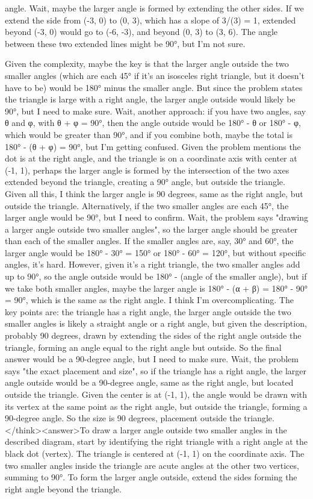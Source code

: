 angle. Wait, maybe the larger angle is formed by extending the other sides. If we extend the side from (-3, 0) to (0, 3), which has a slope of 3/(3) = 1, extended beyond (-3, 0) would go to (-6, -3), and beyond (0, 3) to (3, 6). The angle between these two extended lines might be 90°, but I'm not sure. 

Given the complexity, maybe the key is that the larger angle outside the two smaller angles (which are each 45° if it's an isosceles right triangle, but it doesn't have to be) would be 180° minus the smaller angle. But since the problem states the triangle is large with a right angle, the larger angle outside would likely be 90°, but I need to make sure. Wait, another approach: if you have two angles, say θ and φ, with θ + φ = 90°, then the angle outside would be 180° - θ or 180° - φ, which would be greater than 90°, and if you combine both, maybe the total is 180° - (θ + φ) = 90°, but I'm getting confused. Given the problem mentions the dot is at the right angle, and the triangle is on a coordinate axis with center at (-1, 1), perhaps the larger angle is formed by the intersection of the two axes extended beyond the triangle, creating a 90° angle, but outside the triangle. Given all this, I think the larger angle is 90 degrees, same as the right angle, but outside the triangle. Alternatively, if the two smaller angles are each 45°, the larger angle would be 90°, but I need to confirm. Wait, the problem says "drawing a larger angle outside two smaller angles", so the larger angle should be greater than each of the smaller angles. If the smaller angles are, say, 30° and 60°, the larger angle would be 180° - 30° = 150° or 180° - 60° = 120°, but without specific angles, it's hard. However, given it's a right triangle, the two smaller angles add up to 90°, so the angle outside would be 180° - (angle of the smaller angle), but if we take both smaller angles, maybe the larger angle is 180° - (α + β) = 180° - 90° = 90°, which is the same as the right angle. I think I'm overcomplicating. The key points are: the triangle has a right angle, the larger angle outside the two smaller angles is likely a straight angle or a right angle, but given the description, probably 90 degrees, drawn by extending the sides of the right angle outside the triangle, forming an angle equal to the right angle but outside. So the final answer would be a 90-degree angle, but I need to make sure. Wait, the problem says "the exact placement and size", so if the triangle has a right angle, the larger angle outside would be a 90-degree angle, same as the right angle, but located outside the triangle. Given the center is at (-1, 1), the angle would be drawn with its vertex at the same point as the right angle, but outside the triangle, forming a 90-degree angle. So the size is 90 degrees, placement outside the triangle.</think><answer>To draw a larger angle outside two smaller angles in the described diagram, start by identifying the right triangle with a right angle at the black dot (vertex). The triangle is centered at (-1, 1) on the coordinate axis. The two smaller angles inside the triangle are acute angles at the other two vertices, summing to 90°. To form the larger angle outside, extend the sides forming the right angle beyond the triangle. 